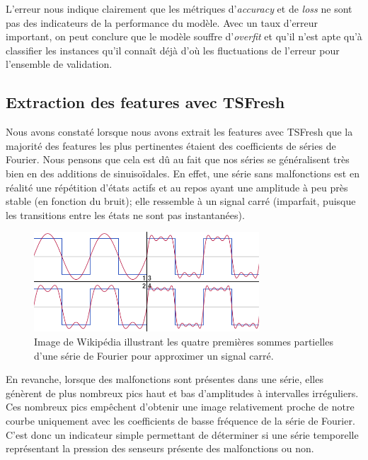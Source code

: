 \documentclass[french]{article}
\theoremstyle{mytheoremstyle}
\theoremstyle{mytheoremstyle}
\theoremstyle{myproblemstyle}
\begin{document}
    L'erreur nous indique clairement que les métriques d'\emph{accuracy} et de \emph{loss} ne sont pas des indicateurs de la performance du modèle. Avec un taux d'erreur important, on peut conclure que le modèle souffre d'\emph{overfit} et qu'il n'est apte qu'à classifier les instances qu'il connaît déjà d'où les fluctuations de l'erreur pour l'ensemble de validation.
    
    \subsection{Extraction des features avec TSFresh}

      Nous avons constaté lorsque nous avons extrait les features avec TSFresh que la majorité des features les plus pertinentes étaient des coefficients de séries de Fourier.
        Nous pensons que cela est dû au fait que nos séries se généralisent très bien en des additions de sinuisoïdales. En effet, une série sans malfonctions est en réalité une répétition d'états actifs et au repos ayant une amplitude à peu près stable (en fonction du bruit); elle ressemble à un signal carré (imparfait, puisque les transitions entre les états ne sont pas instantanées).
        
        \begin{figure}[H]
            \centering
            \includegraphics[width=0.75\textwidth]{images/signal_carre.png}
            \caption{Image de Wikipédia illustrant les quatre premières sommes partielles d'une série de Fourier pour approximer un signal carré.}
            \label{}
        \end{figure}
        
        En revanche, lorsque des malfonctions sont présentes dans une série, elles génèrent de plus nombreux pics haut et bas d'amplitudes à intervalles irréguliers. Ces nombreux pics empêchent d'obtenir une image relativement proche de notre courbe uniquement avec les coefficients de basse fréquence de la série de Fourier. C'est donc un indicateur simple permettant de déterminer si une série temporelle représentant la pression des senseurs présente des malfonctions ou non.
        
\end{document}
